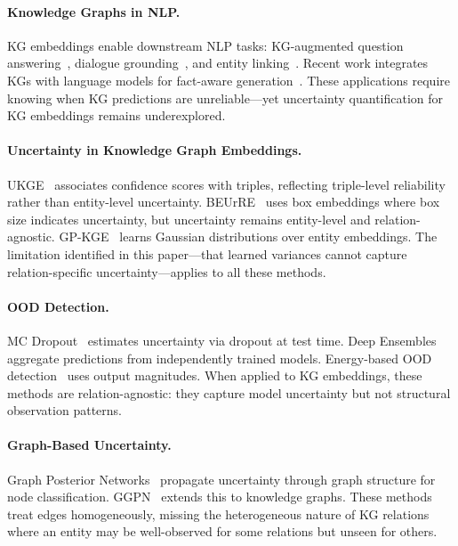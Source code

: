 
\paragraph{Knowledge Graphs in NLP.}
KG embeddings enable downstream NLP tasks: KG-augmented question answering~\citep{zhang2018variational,yasunaga2021qa}, dialogue grounding~\citep{moon2019opendialkg}, and entity linking~\citep{wu2020scalable}.
Recent work integrates KGs with language models for fact-aware generation~\citep{liu2020k,wang2021kepler}.
These applications require knowing when KG predictions are unreliable---yet uncertainty quantification for KG embeddings remains underexplored.

\paragraph{Uncertainty in Knowledge Graph Embeddings.}
UKGE~\citep{chen2019embedding} associates confidence scores with triples, reflecting triple-level reliability rather than entity-level uncertainty.
BEUrRE~\citep{chen2021probabilistic} uses box embeddings where box size indicates uncertainty, but uncertainty remains entity-level and relation-agnostic.
GP-KGE~\citep{Chen2022} learns Gaussian distributions over entity embeddings.
The limitation identified in this paper---that learned variances cannot capture relation-specific uncertainty---applies to all these methods.

\paragraph{OOD Detection.}
MC Dropout~\citep{gal2016dropout} estimates uncertainty via dropout at test time.
Deep Ensembles~\citep{lakshminarayanan2017simple} aggregate predictions from independently trained models.
Energy-based OOD detection~\citep{liu2020energy} uses output magnitudes.
When applied to KG embeddings, these methods are relation-agnostic: they capture model uncertainty but not structural observation patterns.

\paragraph{Graph-Based Uncertainty.}
Graph Posterior Networks~\citep{stadler2021graph} propagate uncertainty through graph structure for node classification.
GGPN~\citep{chen2022graph} extends this to knowledge graphs.
These methods treat edges homogeneously, missing the heterogeneous nature of KG relations where an entity may be well-observed for some relations but unseen for others.

